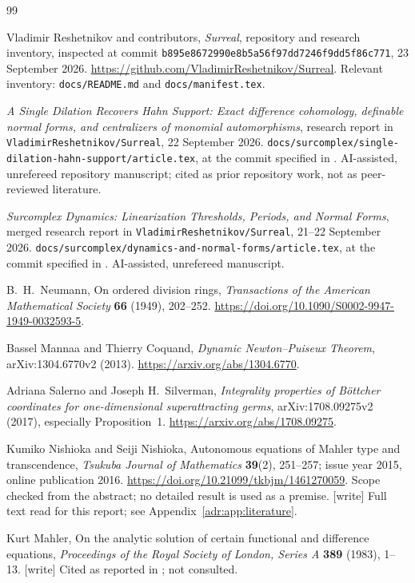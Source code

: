 \documentclass[11pt,letterpaper]{article}
\numberwithin{equation}{section}
\theoremstyle{definition}
\theoremstyle{remark}
\newcommand{\repo}{\texttt{VladimirReshetnikov/Surreal}}
\newcommand{\wtag}{\textup{[write]}}%
\begin{document}
\begin{thebibliography}{99}
\small\raggedright
{}
Vladimir Reshetnikov and contributors,
\emph{Surreal}, repository and research inventory, inspected at commit
\texttt{b895e8672990e8b5a56f97dd7246f9dd5f86c771}, 23 September 2026.
\url{https://github.com/VladimirReshetnikov/Surreal}.
Relevant inventory: \texttt{docs/README.md} and \texttt{docs/manifest.tex}.

\emph{A Single Dilation Recovers Hahn Support: Exact difference cohomology,
definable normal forms, and centralizers of monomial automorphisms}, research report in \repo, 22 September 2026.
\texttt{docs/surcomplex/single-dilation-hahn-support/article.tex},
at the commit specified in \cite{Repo}. AI-assisted, unrefereed repository
manuscript; cited as prior repository work, not as peer-reviewed literature.

\emph{Surcomplex Dynamics: Linearization Thresholds, Periods, and Normal
Forms}, merged research report in \repo, 21--22 September 2026.
\texttt{docs/surcomplex/dynamics-and-normal-forms/article.tex},
at the commit specified in \cite{Repo}. AI-assisted, unrefereed manuscript.

B.~H.~Neumann, On ordered division rings,
\emph{Transactions of the American Mathematical Society} \textbf{66}
(1949), 202--252.
\url{https://doi.org/10.1090/S0002-9947-1949-0032593-5}.

Bassel Mannaa and Thierry Coquand,
\emph{Dynamic Newton--Puiseux Theorem}, arXiv:1304.6770v2 (2013).
\url{https://arxiv.org/abs/1304.6770}.

Adriana Salerno and Joseph H.~Silverman,
\emph{Integrality properties of B\"ottcher coordinates for one-dimensional
superattracting germs}, arXiv:1708.09275v2 (2017), especially Proposition~1.
\url{https://arxiv.org/abs/1708.09275}.

Kumiko Nishioka and Seiji Nishioka,
Autonomous equations of Mahler type and transcendence,
\emph{Tsukuba Journal of Mathematics} \textbf{39}(2), 251--257;
issue year 2015, online publication 2016.
\url{https://doi.org/10.21099/tkbjm/1461270059}.
Scope checked from the abstract; no detailed result is used as a premise.
\wtag{} Full text read for this report; see Appendix~\ref{adr:app:literature}.

Kurt Mahler,
On the analytic solution of certain functional and difference equations,
\emph{Proceedings of the Royal Society of London, Series A} \textbf{389}
(1983), 1--13.
\wtag{} Cited as reported in \cite{NN}; not consulted.


\end{thebibliography}
\end{document}
